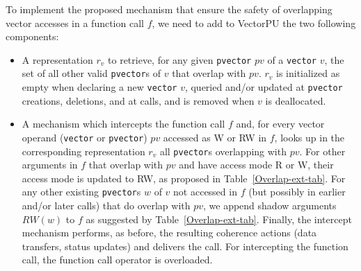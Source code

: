 \documentclass[preprint,12pt]{elsarticle}
\newcommand{\TODO}[1]{\textcolor{red}{\textbf{[TODO:#1]}}}
\begin{document}
To implement the proposed mechanism that ensure the safety of overlapping vector accesses
in a function call $f$, we need to add to VectorPU the two following components:
\begin{itemize}
    \item A representation $r_v$  to retrieve, for any given \texttt{pvector} $pv$
             of a \texttt{vector} $v$, the set of all other valid \texttt{pvector}s of $v$ 
             that overlap with $pv$.
             $r_v$ is initialized as empty when declaring a new \texttt{vector} $v$,
             queried and/or updated at \texttt{pvector} creations, deletions, and at calls,
             and is removed when $v$ is deallocated.
    \item A mechanism which intercepts the function call $f$ and,
          for every vector operand (\texttt{vector} or \texttt{pvector}) $pv$ 
          accessed as W or RW in $f$,
          looks up in the corresponding representation $r_v$ all  
          \texttt{pvector}s overlapping with $pv$. %
          For other arguments in $f$ that overlap with $pv$ and have access mode
          R or W, their access mode
          is updated to RW, as proposed in Table~\ref{Overlap-ext-tab}.
          For any other existing \texttt{pvector}s $w$ of $v$ not accessed in $f$
          (but possibly in earlier and/or later calls) 
          that do overlap with $pv$, 
          we append shadow arguments $RW(w)$ to $f$ as suggested by Table~\ref{Overlap-ext-tab}.
          Finally, the intercept mechanism performs, as before, the resulting coherence
          actions (data transfers, status updates) and delivers the call.
          For intercepting the function call, the function call operator is overloaded.
\end{itemize}
\end{document}
